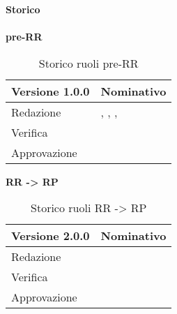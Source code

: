 \newpage
\Large{\textbf{Storico }}\\
\normalsize \\

\textbf{pre-RR}
\label{tabVers1}
\begin{table}[h]
	\begin{tabular}{p{} p{}}
		\toprule \textbf{Versione 1.0.0}	&	\textbf{Nominativo}\\
		\midrule Redazione	& \BM, \TP, \PM, \FM\\
		\midrule Verifica &	\VG\\
		\midrule Approvazione	&	\TP\\
		\bottomrule
	\end{tabular}
	\caption{Storico ruoli pre-RR}
\end{table}

\textbf{RR -> RP}
\label{tabVers2}
\begin{table}[h]
	\begin{tabular}{p{} p{}}
		\toprule \textbf{Versione 2.0.0}	&	\textbf{Nominativo}\\
		\midrule Redazione	& \PM\\
		\midrule Verifica &	\TP\\
		\midrule Approvazione	&	\VG\\
		\bottomrule
	\end{tabular}
	\caption{Storico ruoli RR -> RP}
\end{table}
